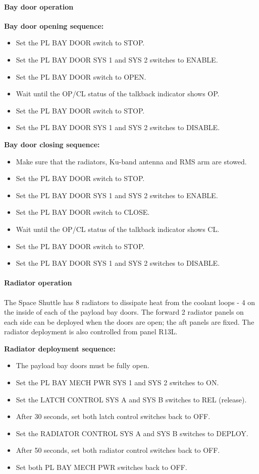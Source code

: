 \documentclass[Orbiter User Manual.tex]{subfiles}
\begin{document}
\paragraph{Bay door operation}
\label{para:atlantis_baydoor}

\textbf{Bay door opening sequence:}
\begin{itemize}
	\item Set the PL BAY DOOR switch to STOP.
	\item Set the PL BAY DOOR SYS 1 and SYS 2 switches to ENABLE.
	\item Set the PL BAY DOOR switch to OPEN.
	\item Wait until the OP/CL status of the talkback indicator shows OP.
	\item Set the PL BAY DOOR switch to STOP.
	\item Set the PL BAY DOOR SYS 1 and SYS 2 switches to DISABLE.
\end{itemize}

\textbf{Bay door closing sequence:}
\begin{itemize}
	\item Make sure that the radiators, Ku-band antenna and RMS arm are stowed.
	\item Set the PL BAY DOOR switch to STOP.
	\item Set the PL BAY DOOR SYS 1 and SYS 2 switches to ENABLE.
	\item Set the PL BAY DOOR switch to CLOSE.
	\item Wait until the OP/CL status of the talkback indicator shows CL.
	\item Set the PL BAY DOOR switch to STOP.
	\item Set the PL BAY DOOR SYS 1 and SYS 2 switches to DISABLE.
\end{itemize}

\paragraph{Radiator operation}
The Space Shuttle has 8 radiators to dissipate heat from the coolant loops - 4
on the inside of each of the payload bay doors. The forward 2 radiator panels on
each side can be deployed when the doors are open; the aft panels are fixed. The
radiator deployment is also controlled from panel R13L.

\textbf{Radiator deployment sequence:}
\begin{itemize}
	\item The payload bay doors must be fully open.
	\item Set the PL BAY MECH PWR SYS 1 and SYS 2 switches to ON.
	\item Set the LATCH CONTROL SYS A and SYS B switches to REL (release).
	\item After 30 seconds, set both latch control switches back to OFF.
	\item Set the RADIATOR CONTROL SYS A and SYS B switches to DEPLOY.
	\item After 50 seconds, set both radiator control switches back to OFF.
	\item Set both PL BAY MECH PWR switches back to OFF.
\end{itemize}
\end{document}
